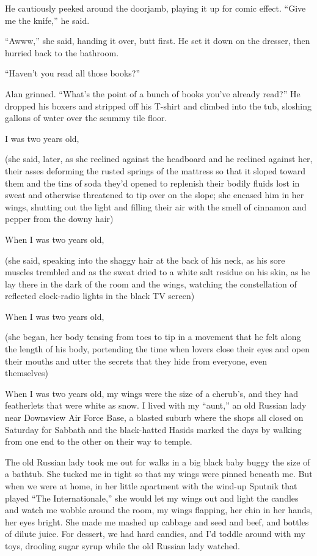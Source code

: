 He cautiously peeked around the doorjamb, playing it up for comic
effect.  ``Give me the knife,'' he said.

``Awww,'' she said, handing it over, butt first.  He set it down on
the dresser, then hurried back to the bathroom.

``Haven't you read all those books?''

Alan grinned.  ``What's the point of a bunch of books you've already
read?'' He dropped his boxers and stripped off his T-shirt and climbed
into the tub, sloshing gallons of water over the scummy tile floor.

 I was two years old,

(she said, later, as she reclined against the headboard and he
reclined against her, their asses deforming the rusted springs of the
mattress so that it sloped toward them and the tins of soda they'd
opened to replenish their bodily fluids lost in sweat and otherwise
threatened to tip over on the slope; she encased him in her wings,
shutting out the light and filling their air with the smell of
cinnamon and pepper from the downy hair)

When I was two years old,

(she said, speaking into the shaggy hair at the back of his neck, as
his sore muscles trembled and as the sweat dried to a white salt
residue on his skin, as he lay there in the dark of the room and the
wings, watching the constellation of reflected clock-radio lights in
the black TV screen)

When I was two years old,

(she began, her body tensing from toes to tip in a movement that he
felt along the length of his body, portending the time when lovers
close their eyes and open their mouths and utter the secrets that they
hide from everyone, even themselves)

When I was two years old, my wings were the size of a cherub's, and
they had featherlets that were white as snow.  I lived with my
``aunt,'' an old Russian lady near Downsview Air Force Base, a blasted
suburb where the shops all closed on Saturday for Sabbath and the
black-hatted Hasids marked the days by walking from one end to the
other on their way to temple.

The old Russian lady took me out for walks in a big black baby buggy
the size of a bathtub.  She tucked me in tight so that my wings were
pinned beneath me.  But when we were at home, in her little apartment
with the wind-up Sputnik that played ``The Internationale,'' she would
let my wings out and light the candles and watch me wobble around the
room, my wings flapping, her chin in her hands, her eyes bright.  She
made me mashed up cabbage and seed and beef, and bottles of dilute
juice.  For dessert, we had hard candies, and I'd toddle around with
my toys, drooling sugar syrup while the old Russian lady watched.

